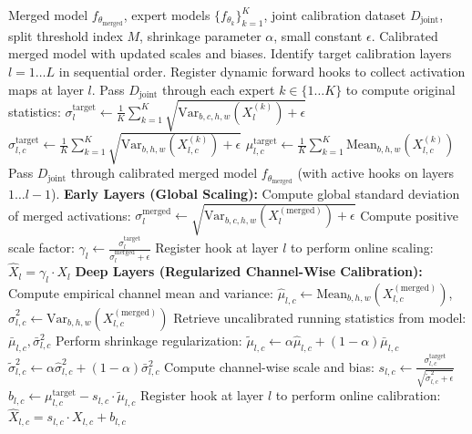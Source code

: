 \documentclass{article}
\begin{document}
\begin{algorithm}[htbp]
\caption{Hybrid Selective Calibration (HSC)}
\label{alg:hsc}
\begin{algorithmic}[1]
 Merged model $f_{\theta_{\text{merged}}}$, expert models $\{f_{\theta_k}\}_{k=1}^K$, joint calibration dataset $D_{\text{joint}}$, split threshold index $M$, shrinkage parameter $\alpha$, small constant $\epsilon$.
 Calibrated merged model with updated scales and biases.
\STATE Identify target calibration layers $l = 1 \dots L$ in sequential order.
   \STATE Register dynamic forward hooks to collect activation maps at layer $l$.
   \STATE Pass $D_{\text{joint}}$ through each expert $k \in \{1 \dots K\}$ to compute original statistics:
   \STATE \quad $\sigma^{\text{target}}_l \leftarrow \frac{1}{K} \sum_{k=1}^K \sqrt{\text{Var}_{b,c,h,w}(X_l^{(k)}) + \epsilon}$
   \STATE \quad $\sigma^{\text{target}}_{l,c} \leftarrow \frac{1}{K} \sum_{k=1}^K \sqrt{\text{Var}_{b,h,w}(X_{l,c}^{(k)}) + \epsilon}$
   \STATE \quad $\mu^{\text{target}}_{l,c} \leftarrow \frac{1}{K} \sum_{k=1}^K \text{Mean}_{b,h,w}(X_{l,c}^{(k)})$
   \STATE Pass $D_{\text{joint}}$ through calibrated merged model $f_{\theta_{\text{merged}}}$ (with active hooks on layers $1 \dots l-1$).
      \STATE \textbf{Early Layers (Global Scaling):}
      \STATE Compute global standard deviation of merged activations:
      \STATE \quad $\sigma^{\text{merged}}_l \leftarrow \sqrt{\text{Var}_{b,c,h,w}(X_l^{(\text{merged})}) + \epsilon}$
      \STATE Compute positive scale factor: $\gamma_l \leftarrow \frac{\sigma^{\text{target}}_l}{\sigma^{\text{merged}}_l + \epsilon}$
      \STATE Register hook at layer $l$ to perform online scaling: $\hat{X}_l = \gamma_l \cdot X_l$
   \ELSE
      \STATE \textbf{Deep Layers (Regularized Channel-Wise Calibration):}
      \STATE Compute empirical channel mean and variance:
      \STATE \quad $\hat{\mu}_{l,c} \leftarrow \text{Mean}_{b,h,w}(X_{l,c}^{(\text{merged})})$, \quad $\hat{\sigma}^2_{l,c} \leftarrow \text{Var}_{b,h,w}(X_{l,c}^{(\text{merged})})$
      \STATE Retrieve uncalibrated running statistics from model: $\bar{\mu}_{l,c}, \bar{\sigma}^2_{l,c}$
      \STATE Perform shrinkage regularization:
      \STATE \quad $\tilde{\mu}_{l,c} \leftarrow \alpha \hat{\mu}_{l,c} + (1 - \alpha) \bar{\mu}_{l,c}$
      \STATE \quad $\tilde{\sigma}^2_{l,c} \leftarrow \alpha \hat{\sigma}^2_{l,c} + (1 - \alpha) \bar{\sigma}^2_{l,c}$
      \STATE Compute channel-wise scale and bias:
      \STATE \quad $s_{l,c} \leftarrow \frac{\sigma^{\text{target}}_{l,c}}{\sqrt{\tilde{\sigma}^2_{l,c} + \epsilon}}$
      \STATE \quad $b_{l,c} \leftarrow \mu^{\text{target}}_{l,c} - s_{l,c} \cdot \tilde{\mu}_{l,c}$
      \STATE Register hook at layer $l$ to perform online calibration: $\hat{X}_{l,c} = s_{l,c} \cdot X_{l,c} + b_{l,c}$
   \ENDIF
\ENDFOR
\end{algorithmic}
\end{algorithm}
\end{document}
